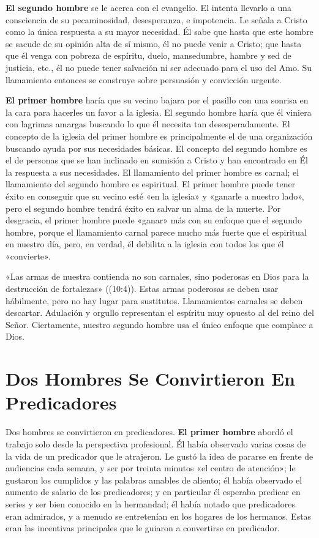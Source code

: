 \documentclass[12pt, twoside, openright]{book}
\begin{document}
\textbf{El segundo hombre} se le acerca con el evangelio. El intenta llevarlo a una consciencia de su pecaminosidad, desesperanza, e impotencia. Le señala a Cristo como la única respuesta a su mayor necesidad. Él sabe que hasta que este hombre se sacude de su opinión alta de sí mismo, él no puede venir a Cristo; que hasta que él venga con pobreza de espíritu, duelo, mansedumbre, hambre y sed de justicia, etc., él no puede tener salvación ni ser adecuado para el uso del Amo. Su llamamiento entonces se construye sobre persuasión y convicción urgente. 

\textbf{El primer hombre} haría que su vecino bajara por el pasillo con una sonrisa en la cara para hacerles un favor a la iglesia. El segundo hombre haría que él viniera con lagrimas amargas buscando lo que él necesita tan desesperadamente. El concepto de la iglesia del primer hombre es principalmente el de una organización buscando ayuda por sus necesidades básicas. El concepto del segundo hombre es el de personas que se han inclinado en sumisión a Cristo y han encontrado en Él la respuesta a sus necesidades. El llamamiento del primer hombre es carnal; el llamamiento del segundo hombre es espiritual. El primer hombre puede tener éxito en conseguir que su vecino esté «en la iglesia» y «ganarle a nuestro lado», pero el segundo hombre tendrá éxito en salvar un alma de la muerte. Por desgracia, el primer hombre puede «ganar» más con su enfoque que el segundo hombre, porque el llamamiento carnal parece mucho más fuerte que el espiritual en nuestro día, pero, en verdad, él debilita a la iglesia con todos los que él «convierte».

«Las armas de nuestra contienda no son carnales, sino poderosas en Dios para la destrucción de fortalezas» ((10:4)). Estas armas poderosas se deben usar hábilmente, pero no hay lugar para sustitutos. Llamamientos carnales se deben descartar. Adulación y orgullo representan el espíritu muy opuesto al del reino del Señor. Ciertamente, nuestro segundo hombre usa el único enfoque que complace a Dios. 

\section{Dos Hombres Se Convirtieron En Predicadores}
Dos hombres se convirtieron en predicadores. \textbf{El primer hombre} abordó el trabajo solo desde la perspectiva profesional. Él había observado varias cosas de la vida de un predicador que le atrajeron. Le gustó la idea de pararse en frente de audiencias cada semana, y ser por treinta minutos «el centro de atención»; le gustaron los cumplidos y las palabras amables de aliento; él había observado el aumento de salario de los predicadores; y en particular él esperaba predicar en series y ser bien conocido en la hermandad; él había notado que predicadores eran admirados, y a menudo se entretenían en los hogares de los hermanos. Estas eran las incentivas principales que le guiaron a convertirse en predicador. 
\end{document}
